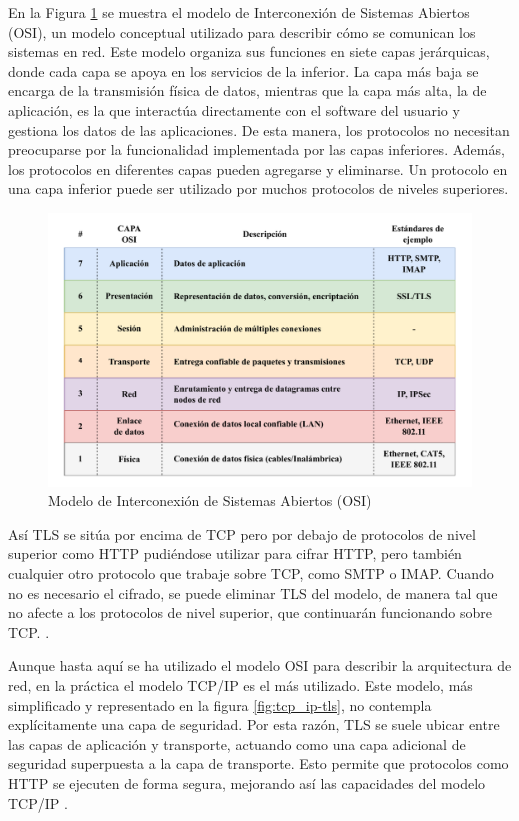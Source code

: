 En la Figura \ref{fig:OSI} se muestra el modelo de Interconexión de Sistemas Abiertos (OSI), un modelo conceptual utilizado para describir cómo se comunican los sistemas en red. Este modelo organiza sus funciones en siete capas jerárquicas, donde cada capa se apoya en los servicios de la inferior. La capa más baja se encarga de la transmisión física de datos, mientras que la capa más alta, la de aplicación, es la que interactúa directamente con el software del usuario y gestiona los datos de las aplicaciones. De esta manera, los protocolos no necesitan preocuparse por la funcionalidad implementada por las capas inferiores. Además, los protocolos en diferentes capas pueden agregarse y eliminarse. Un protocolo en una capa inferior puede ser utilizado por muchos protocolos de niveles superiores. 

\begin{figure}
    \centering
    \includegraphics[width=1\linewidth]{Imagenes/Seguridad de las comunicaciones/OSI.pdf}
    \caption{Modelo de Interconexión de Sistemas Abiertos (OSI)}
    \label{fig:OSI}
\end{figure}


Así TLS se sitúa por encima de TCP pero por debajo de protocolos de nivel superior como HTTP pudiéndose utilizar para cifrar HTTP, pero también cualquier otro protocolo que trabaje sobre TCP, como SMTP o IMAP. Cuando no es necesario el cifrado, se puede eliminar TLS del modelo, de manera tal que no afecte a los protocolos de nivel superior, que continuarán funcionando sobre TCP. \cite{ristic2014bulletproof}. 

Aunque hasta aquí se ha utilizado el modelo OSI para describir la arquitectura de red, en la práctica el modelo TCP/IP es el más utilizado. Este modelo, más simplificado y representado en la figura \ref{fig:tcp_ip-tls}, no contempla explícitamente una capa de seguridad. Por esta razón, TLS se suele ubicar entre las capas de aplicación y transporte, actuando como una capa adicional de seguridad superpuesta a la capa de transporte. Esto permite que protocolos como HTTP se ejecuten de forma segura, mejorando así las capacidades del modelo TCP/IP \cite{tracy2002guidelines}.

